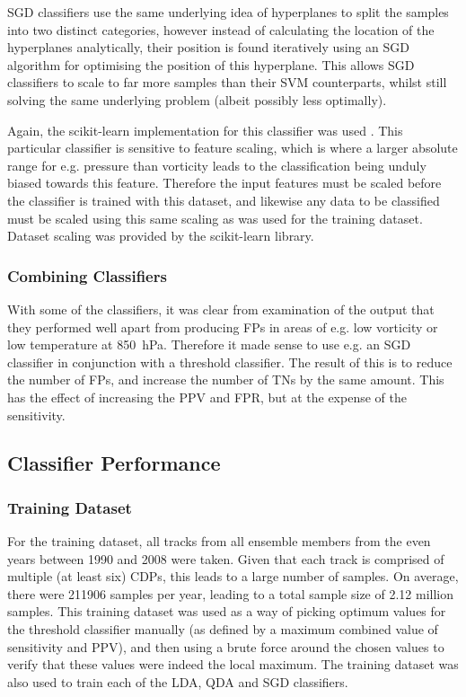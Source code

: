 \documentclass[pdftex,12pt,a4paper]{report}
\begin{document}
SGD classifiers use the same underlying idea of hyperplanes to split the samples into two distinct
categories, however instead of calculating the location of the hyperplanes analytically, their
position is found iteratively using an SGD algorithm for optimising the position of this hyperplane.
This allows SGD classifiers to scale to far more samples than their SVM counterparts, whilst still
solving the same underlying problem (albeit possibly less optimally).

Again, the scikit-learn implementation for this classifier was used \parencite{scikitLearn2011}.
This particular classifier is sensitive to feature scaling, which is where a larger absolute range
for e.g. pressure than vorticity leads to the classification being unduly biased towards this
feature. Therefore the input features must be scaled before the classifier is trained with this
dataset, and likewise any data to be classified must be scaled using this same scaling as was used
for the training dataset. Dataset scaling was provided by the scikit-learn library.

\subsubsection{Combining Classifiers}
With some of the classifiers, it was clear from examination of the output that they performed well
apart from producing FPs in areas of e.g. low vorticity or low temperature at \SI{850}{hPa}.
Therefore it made sense to use e.g. an SGD classifier in conjunction with a threshold classifier.
The result of this is to reduce the number of FPs, and increase the number of TNs by the same
amount. This has the effect of increasing the PPV and FPR, but at the expense of the sensitivity.

\subsection{Classifier Performance}


\subsubsection{Training Dataset}
\label{sec:training_dataset}
For the training dataset, all tracks from all ensemble members from the even years between 1990 and
2008 were taken. Given that each track is comprised of multiple (at least six) CDPs, this leads to a
large number of samples. On average, there were \SI{211906}{} samples per year, leading to a total
sample size of 2.12 million samples. This training dataset was used as a way of picking optimum
values for the threshold classifier manually (as defined by a maximum combined value of sensitivity
and PPV), and then using a brute force around the chosen values to verify that these values were
indeed the local maximum. The training dataset was also used to train each of the LDA, QDA and SGD
classifiers.
\end{document}
